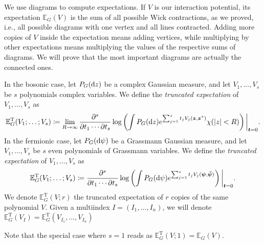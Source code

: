 We use diagrams to compute expectations. If $V$ is our interaction potential, its expectation
$\mathbb{E}_G(V)$ is the sum of all possible Wick contractions, as we proved, i.e., all
possible diagrams with one vertex and all lines contracted. Adding more copies of $V$ inside
the expectation means adding vertices, while multiplying by other expectations means
multiplying the values of the respective sums of diagrams. We will prove that the most
important diagrams are actually the connected ones. 

\begin{definition}
	In the bosonic case, let $P_G(\mathrm{d} z)$ be a complex Gaussian measure, and let
	$V_1,\ldots,V_s$ be $s$ polynomials complex variables. We define the \textit{truncated
	expectation} of $V_1,\ldots,V_s$ as
	\begin{align*}
		\mathbb{E}_G^{\mathrm{T}}(V_1;\ldots;V_s) \coloneq
		\lim_{R\to\infty}\frac{\partial^s}{\partial t_1\cdots\partial t_s}\log\left(
			\int P_G(\mathrm{d} z) e^{\sum_{j=1}^s t_j V_j(\boldsymbol{z},\boldsymbol{z}^*)}\chi(|z|<R)
		\right)\bigg|_{\boldsymbol{t}=0}.
	\end{align*}
	In the fermionic case, let $P_G(\mathrm{d}\psi)$ be a Grassmann Gaussian measure, and let
	$V_1,\ldots,V_s$ be $s$ even polynomials of Grassmann variables. We define the
	\textit{truncated expectation} of $V_1,\ldots,V_s$ as
	\begin{align*}
		\mathbb{E}_G^{\mathrm{T}}(V_1;\ldots;V_s)\coloneq
		\frac{\partial^s}{\partial t_1\cdots\partial t_s}\log\left(
			\int P_G(\mathrm{d}\psi) e^{\sum_{j=1}^s t_j V_j(\boldsymbol{\psi},\boldsymbol{\bar\psi})}
		\right)\bigg|_{\boldsymbol{t}=0}.
	\end{align*}
	We denote $\mathbb{E}_G^{\mathrm{T}}(V;r)$ the truncated expectation of $r$ copies of the same polynomial
	$V$. Given a multiindex $I=(I_1,\ldots,I_n)$, we will denote $\mathbb{E}_G^{\mathrm{T}}(V_I)
	=\mathbb{E}_G^{\mathrm{T}}(V_{I_1},\ldots,V_{I_n})$
\end{definition}
\begin{remark}
	Note that the special case where $s=1$ reads as $\mathbb{E}_G^{\mathrm{T}}(V;1)=\mathbb{E}_G(V)$.
\end{remark}

